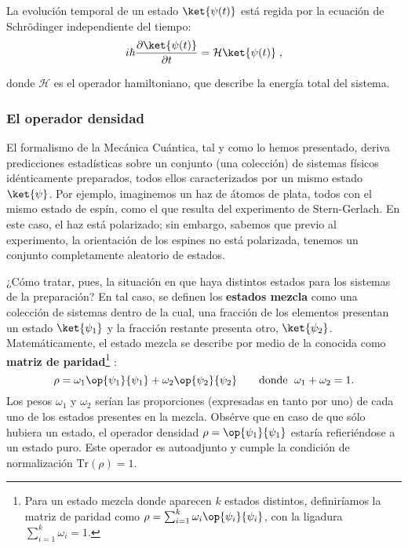\documentclass[11pt,a4paper,twoside,pdf]{article}
\numberwithin{equation}{section}
\begin{document}
			La evolución temporal de un estado $\ket{\psi(t)}$ está regida por la ecuación de Schrödinger independiente del tiempo:
		   		\begin{equation}
		    		i \hbar \frac{ \partial \ket{\psi(t)} }{ \partial t} = \mathcal{H} \ket{\psi(t)} \; ,
 		   		\end{equation}
			  
			donde $\mathcal{H}$ es el operador hamiltoniano, que describe la energía total del sistema.
			\\
		
		\subsubsection{El operador densidad} \label{subsubsec: densidad}
			  
		El formalismo de la Mecánica Cuántica, tal y como lo hemos presentado, deriva predicciones estadísticas sobre un conjunto (una colección) de sistemas físicos idénticamente preparados, todos ellos caracterizados por un mismo estado $\ket{\psi}$. Por ejemplo, imaginemos un haz de átomos de plata, todos con el mismo estado de espín, como el que resulta del experimento de Stern-Gerlach. En este caso, el haz está polarizado; sin embargo, sabemos que previo al experimento, la orientación de los espines no está polarizada, tenemos un conjunto completamente aleatorio de estados.
		
		¿Cómo tratar, pues,  la situación en que haya distintos estados para los sistemas de la preparación? En tal caso, se definen los \textbf{estados mezcla} como una colección de sistemas dentro de la cual, una fracción de los elementos presentan un estado $\ket{\psi_1}$ y la fracción restante presenta otro, $\ket{\psi_2}$.	Matemáticamente, el estado mezcla se describe por medio de la conocida como \textbf{matriz de paridad}\footnote{ Para un estado mezcla donde aparecen $k$ estados distintos, definiríamos la matriz de paridad como $\rho = \sum_{i=1}^k \omega_i \op{\psi_i}{\psi_i}$, con la ligadura $\sum_{i=1}^k \omega_i=1$.} : 
			\begin{equation}\label{eq: Paridad}
				\rho=\omega_1 \op{\psi_1}{\psi_1} + \omega_2 \op{\psi_2}{\psi_2}  \qquad \text{donde } \; \omega_1+\omega_2=1 .
			\end{equation}
		Los pesos $\omega_1$ y $\omega_2$ serían las proporciones (expresadas en tanto por uno) de cada uno de los estados presentes en la mezcla. Obsérve que en caso de que sólo hubiera un estado, el operador densidad $\rho=\op{\psi_1}{\psi_1}$ estaría refieriéndose a un estado puro. Este operador es autoadjunto y cumple la condición de normalización $\text{Tr}(\rho)=1$.
		
\end{document}
